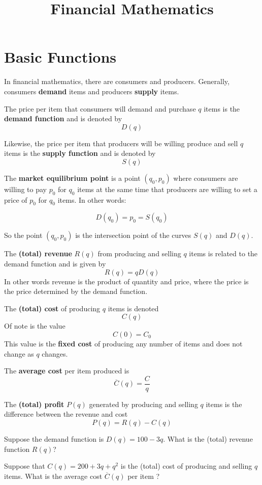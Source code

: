 \documentclass{ximera}
\title[Dig-In:]{Financial Mathematics}
\begin{document}
\begin{abstract}
 \end{abstract}
\maketitle

\section{Basic Functions}
In financial mathematics, there are consumers and producers. Generally, consumers {\bf demand} items and producers {\bf supply} items. 

The price per item that consumers will demand and purchase $q$ items is the {\bf demand function} and is denoted by 
$$D(q)$$

Likewise, the price per item that producers will be willing produce and sell $q$ items is the {\bf supply function} and is denoted by
$$S(q)$$

The {\bf market equilibrium point} is a point $(q_{0},p_{0})$ where consumers are willing to pay $p_{0}$ for $q_{0}$ items at the
same time that producers are willing to set a price of $p_{0}$ for $q_{0}$ items. In other words:

$$D(q_{0})=p_{0}=S(q_{0})$$

So the point $(q_{0},p_{0})$ is the intersection point of the curves $S(q)$ and $D(q)$.



The {\bf (total) revenue} $R(q)$ from producing and selling $q$ items is related to the demand function and is given by
$$R(q)=qD(q)$$
In other words revenue is the product of quantity and price, where the price is the price determined by the demand function.

The {\bf (total) cost} of producing $q$ items is denoted
$$C(q)$$
Of note is the value
$$C(0)=C_{0}$$
This value is the {\bf fixed cost} of producing any number of items and does not change as $q$ changes.

The {\bf average cost} per item produced is
$$\overline{C}(q) = \frac{C}{q}$$

The {\bf (total) profit} $P(q)$ generated by producing and selling $q$ items is the difference between the revenue and cost
$$P(q)=R(q)-C(q)$$


\begin{question}
Suppose the demand function is $D(q)=100-3q$. What is the (total) revenue function $R(q)$?
\begin{selectAll}
\end{selectAll}
Suppose that $C(q)=200+3q+q^{2}$ is the (total) cost of producing and selling $q$ items. What is the average cost $\overline{C}(q)$ per item ?
\begin{selectAll}
\end{selectAll}
\end{question}
\end{document}
